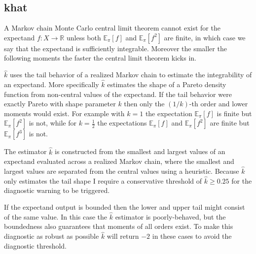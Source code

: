 \documentclass[
  letterpaper,
  DIV=11,
  numbers=noendperiod]{scrartcl}
\begin{document}
\hypertarget{khat}{%
\subsection{khat}\label{khat}}

A Markov chain Monte Carlo central limit theorem cannot exist for the
expectand \(f : X \rightarrow \mathbb{R}\) unless both
\(\mathbb{E}_{\pi}[f]\) and \(\mathbb{E}_{\pi}[f^{2}]\) are finite, in
which case we say that the expectand is sufficiently integrable.
Moreover the smaller the following moments the faster the central limit
theorem kicks in.

\(\hat{k}\) uses the tail behavior of a realized Markov chain to
estimate the integrability of an expectand. More specifically
\(\hat{k}\) estimates the shape of a Pareto density function from
non-central values of the expectand. If the tail behavior were exactly
Pareto with shape parameter \(k\) then only the \((1 / k)\)-th order and
lower moments would exist. For example with \(k = 1\) the expectation
\(\mathbb{E}_{\pi}[f]\) is finite but \(\mathbb{E}_{\pi}[f^{2}]\) is
not, while for \(k = \frac{1}{2}\) the expectations
\(\mathbb{E}_{\pi}[f]\) and \(\mathbb{E}_{\pi}[f^{2}]\) are finite but
\(\mathbb{E}_{\pi}[f^{3}]\) is not.

The estimator \(\hat{k}\) is constructed from the smallest and largest
values of an expectand evaluated across a realized Markov chain, where
the smallest and largest values are separated from the central values
using a heuristic. Because \(\hat{k}\) only estimates the tail shape I
require a conservative threshold of \(\hat{k} \ge 0.25\) for the
diagnostic warning to be triggered.

If the expectand output is bounded then the lower and upper tail might
consist of the same value. In this case the \(\hat{k}\) estimator is
poorly-behaved, but the boundedness also guarantees that moments of all
orders exist. To make this diagnostic as robust as possible \(\hat{k}\)
will return \(-2\) in these cases to avoid the diagnostic threshold.
\end{document}
